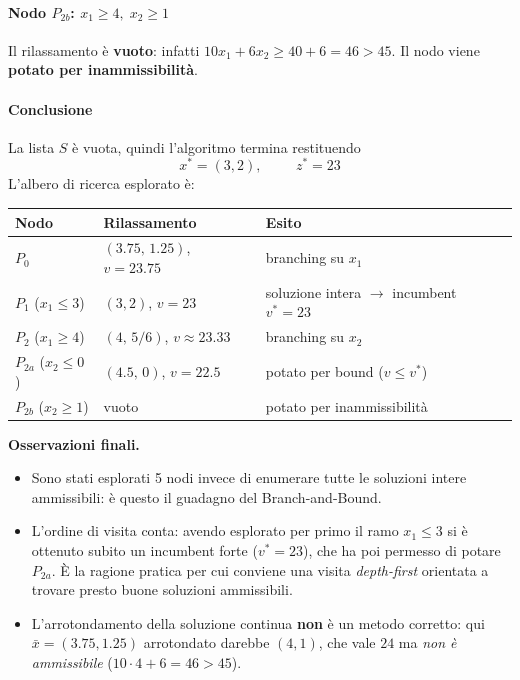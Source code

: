 \documentclass[12pt]{extarticle} %
\begin{document}
\paragraph{Nodo $P_{2b}$: $x_1 \ge 4, \; x_2 \ge 1$}
Il rilassamento è \textbf{vuoto}: infatti $10x_1 + 6x_2 \ge 40 + 6 = 46 > 45$. Il nodo viene \textbf{potato per inammissibilità}.

\paragraph{Conclusione}
La lista $S$ è vuota, quindi l'algoritmo termina restituendo
\[
x^* = (3,2), \hspace{1cm} z^* = 23
\]
L'albero di ricerca esplorato è:
\begin{center}
\begin{tabular}{lll}
\hline
Nodo & Rilassamento & Esito \\
\hline
$P_0$ & $(3.75,\,1.25)$, $v = 23.75$ & branching su $x_1$ \\
$P_1$ ($x_1 \le 3$) & $(3,2)$, $v = 23$ & soluzione intera $\to$ incumbent $v^*=23$ \\
$P_2$ ($x_1 \ge 4$) & $(4,\,5/6)$, $v \approx 23.33$ & branching su $x_2$ \\
$P_{2a}$ ($x_2 \le 0$) & $(4.5,\,0)$, $v = 22.5$ & potato per bound ($v \le v^*$) \\
$P_{2b}$ ($x_2 \ge 1$) & vuoto & potato per inammissibilità \\
\hline
\end{tabular}
\end{center}

\noindent\textbf{Osservazioni finali.}
\begin{itemize}
    \item Sono stati esplorati 5 nodi invece di enumerare tutte le soluzioni intere ammissibili: è questo il guadagno del Branch-and-Bound.
    \item L'ordine di visita conta: avendo esplorato per primo il ramo $x_1 \le 3$ si è ottenuto subito un incumbent forte ($v^*=23$), che ha poi permesso di potare $P_{2a}$. È la ragione pratica per cui conviene una visita \textit{depth-first} orientata a trovare presto buone soluzioni ammissibili.
    \item L'arrotondamento della soluzione continua \textbf{non} è un metodo corretto: qui $\bar{x} = (3.75, 1.25)$ arrotondato darebbe $(4,1)$, che vale $24$ ma \textit{non è ammissibile} ($10\cdot4 + 6 = 46 > 45$).
\end{itemize}
\end{document}
